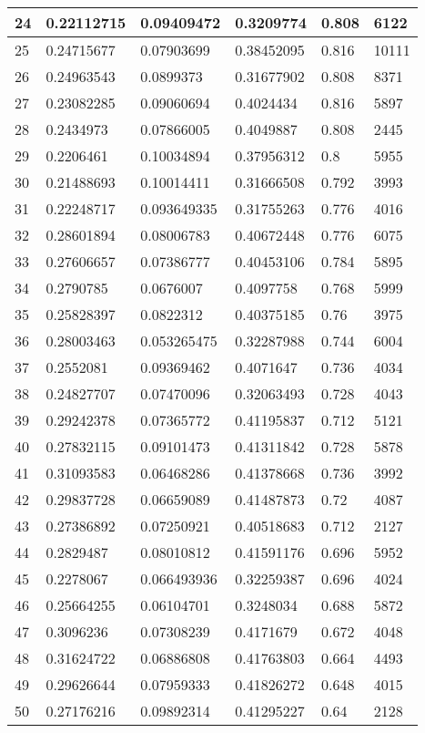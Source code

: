 \begin{longtable}{|l|l|l|l|l|l|}
24 & 0.22112715 & 0.09409472 & 0.3209774 & 0.808 & 6122 \\ \hline 
25 & 0.24715677 & 0.07903699 & 0.38452095 & 0.816 & 10111 \\ \hline 
26 & 0.24963543 & 0.0899373 & 0.31677902 & 0.808 & 8371 \\ \hline 
27 & 0.23082285 & 0.09060694 & 0.4024434 & 0.816 & 5897 \\ \hline 
28 & 0.2434973 & 0.07866005 & 0.4049887 & 0.808 & 2445 \\ \hline 
29 & 0.2206461 & 0.10034894 & 0.37956312 & 0.8 & 5955 \\ \hline 
30 & 0.21488693 & 0.10014411 & 0.31666508 & 0.792 & 3993 \\ \hline 
31 & 0.22248717 & 0.093649335 & 0.31755263 & 0.776 & 4016 \\ \hline 
32 & 0.28601894 & 0.08006783 & 0.40672448 & 0.776 & 6075 \\ \hline 
33 & 0.27606657 & 0.07386777 & 0.40453106 & 0.784 & 5895 \\ \hline 
34 & 0.2790785 & 0.0676007 & 0.4097758 & 0.768 & 5999 \\ \hline 
35 & 0.25828397 & 0.0822312 & 0.40375185 & 0.76 & 3975 \\ \hline 
36 & 0.28003463 & 0.053265475 & 0.32287988 & 0.744 & 6004 \\ \hline 
37 & 0.2552081 & 0.09369462 & 0.4071647 & 0.736 & 4034 \\ \hline 
38 & 0.24827707 & 0.07470096 & 0.32063493 & 0.728 & 4043 \\ \hline 
39 & 0.29242378 & 0.07365772 & 0.41195837 & 0.712 & 5121 \\ \hline 
40 & 0.27832115 & 0.09101473 & 0.41311842 & 0.728 & 5878 \\ \hline 
41 & 0.31093583 & 0.06468286 & 0.41378668 & 0.736 & 3992 \\ \hline 
42 & 0.29837728 & 0.06659089 & 0.41487873 & 0.72 & 4087 \\ \hline 
43 & 0.27386892 & 0.07250921 & 0.40518683 & 0.712 & 2127 \\ \hline 
44 & 0.2829487 & 0.08010812 & 0.41591176 & 0.696 & 5952 \\ \hline 
45 & 0.2278067 & 0.066493936 & 0.32259387 & 0.696 & 4024 \\ \hline 
46 & 0.25664255 & 0.06104701 & 0.3248034 & 0.688 & 5872 \\ \hline 
47 & 0.3096236 & 0.07308239 & 0.4171679 & 0.672 & 4048 \\ \hline 
48 & 0.31624722 & 0.06886808 & 0.41763803 & 0.664 & 4493 \\ \hline 
49 & 0.29626644 & 0.07959333 & 0.41826272 & 0.648 & 4015 \\ \hline 
50 & 0.27176216 & 0.09892314 & 0.41295227 & 0.64 & 2128 \\ \hline 
\end{longtable}